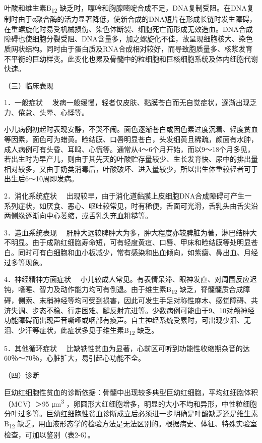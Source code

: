 叶酸和维生素B\textsubscript{12}
缺乏时，嘌呤和胸腺嘧啶合成不足，DNA复制受阻。在DNA复制时由于α聚合酶的活力显著降低，使新合成的DNA短片在形成长链时发生障碍，在重螺旋化时易受机械损伤、染色体断裂、细胞死亡而形成无效造血。DNA合成障碍也使细胞分裂受阻、DNA含量多，加之螺旋化不佳，故呈现细胞核大、染色质网状结构。同时由于蛋白质及RNA合成相对较好，而导致胞质量多、核浆发育不平衡的巨幼样变。此变化也累及骨髓中的粒细胞和巨核细胞系统及体内细胞代谢快速。

（三）临床表现

{1．一般症状}
　发病一般缓慢，轻者仅皮肤、黏膜苍白而无自觉症状，逐渐出现乏力、倦怠、头晕、心悸等。

小儿病例初起时表现安静，不哭不闹。面色逐渐苍白或因色素过度沉着、轻度贫血等因素，面色可为蜡黄。睑结膜、口唇明显苍白，头发细黄且稀疏，颜面有水肿，成人病例可有头昏、耳鸣、心慌等。通常从4～6个月开始，而以9～18个月多见，若出生时为早产儿，则由于其先天的叶酸贮存量较少、生长发育快、尿中的排出量相对较多，又由于奶类消毒后，叶酸破坏、进入量较少，所以出生体重较轻者可于出生后6～10周即发病。

{2．消化系统症状}
　出现较早，由于消化道黏膜上皮细胞DNA合成障碍可产生一系列症状，如厌食、恶心、呕吐较常见，时有稀便，舌面可光滑，舌乳头由舌尖沿两侧缘逐渐向中心萎缩，或舌乳头充血粗糙等。

{3．造血系统表现}
　肝肿大远较脾肿大为多，肿大程度亦较脾脏为著，淋巴结肿大不明显。由于成熟红细胞寿命短，可有轻度黄疸、口唇、甲床和睑结膜等处明显苍白。同时可有白细胞和血小板减少，常有感染和出血倾向，如紫癜、鼻出血、月经过多等现象。

{4．神经精神方面症状}
　小儿较成人常见。有表情呆滞、眼神发直、对周围反应迟钝，嗜睡、智力及动作能力均可有倒退。由于维生素B\textsubscript{12}
缺乏，脊髓髓质合成障碍，侧索、末梢神经等均可受到损害，因此可发生手足对称性麻木、感觉障碍、共济失调、步态不稳、行走困难、腱反射亢进等。少数病例可能由于9、10对颅神经功能障碍而出现声音嘶哑或咽部有痰声。自主神经系统受累时，可出现少泪、无泪、少汗等症状，此症状多见于维生素B\textsubscript{12}
缺乏。

{5．其他循环症状}
　比缺铁性贫血为显著，心前区可听到功能性收缩期杂音的达60％～70％，心脏扩大，易引起心功能不全。

（四）诊断

巨幼红细胞性贫血的诊断依据：骨髓中出现较多典型巨幼红细胞，平均红细胞体积（MCV）＞95
μm\textsuperscript{3}
，卵圆形大红细胞增多，明显的大小不均和异形，中性粒细胞分叶过多等。巨幼红细胞性贫血诊断成立后必须进一步明确是叶酸缺乏还是维生素B\textsubscript{12}
缺乏。用血液形态学的检验方法是无法区别的。根据病史、体征、特殊实验室检查，可加以鉴别（表2-6）。

